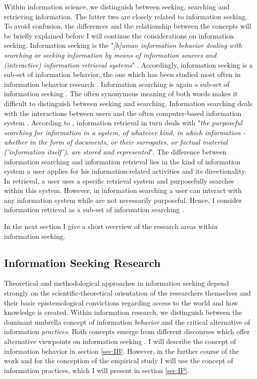 \documentclass[12pt, a4paper, titlepage, oneside, abstract=true, toc=listof, toc=bibliography, BCOR=1cm]{scrreprt}
\begin{document}
Within information science, we distinguish between seeking, searching and retrieving information. The latter two are closely related to information seeking. To avoid confusion, the differences and the relationship between the concepts will be briefly explained before I will continue the considerations on information seeking. Information seeking is the "\textit{[h]uman information behavior dealing with searching or seeking information by means of information sources and (interactive) information retrieval systems}" \citep[p. 21]{Ingwersen2005}. Accordingly, information seeking is a sub-set of information behavior, the one which has been studied most often in information behavior research \citep{Greifeneder2014}. Information searching is again a sub-set of information seeking \citep[p. 263]{Wilson1999}. The often synonymous meaning of both words makes it difficult to distinguish between seeking and searching. Information searching deals with the interactions between users and the often computer-based information system \citep[p. 261]{Wilson1999}. According to \citet{SparckJones1997}, information retrieval in turn deals with "\textit{the purposeful searching for information in a system, of whatever kind, in which information - whether in the form of documents, or their surrogates, or factual material ('information itself'), are stored and represented}". The difference between information searching and information retrieval lies in the kind of information system a user applies for his information-related activities and its directionality. In retrieval, a user uses a specific retrieval system and purposefully searches within this system. However, in information searching a user can interact with any information system while are not necessarily purposeful. Hence, I consider information retrieval as a sub-set of information searching \citep{Bawden2007}. 

In the next section I give a short overview of the research areas within information seeking. 

\subsection{Information Seeking Research}

Theoretical and methodological approaches in information seeking depend strongly on the scientific-theoretical orientation of the researchers themselves and their basic epistemological convictions regarding access to the world and how knowledge is created. Within information research, we distinguish between the dominant umbrella concept of information \textit{behavior} and the critical alternative of information \textit{practices}. Both concepts emerge from different discourses which offer alternative viewpoints on information seeking \citep{Savolainen2007}. I will describe the concept of information behavior in section \ref{sec:IB}. However, in the further course of the work and for the conception of the empirical study I will use the concept of information practices, which I will present in section \ref{sec:IP}.
\end{document}
